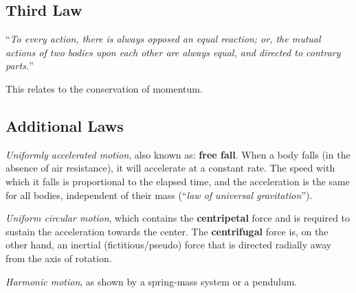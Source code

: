 \subsection{Third Law}\label{subsec:third-law}

``\textit{To every action, there is always opposed an equal reaction; or, the mutual actions of two bodies upon each other are always equal, and directed to contrary parts.}''

This relates to the conservation of momentum.

\subsection{Additional Laws}\label{subsec:additional-laws}

\noindent \textit{Uniformly accelerated motion}, also known as: \textbf{free fall}.
When a body falls (in the absence of air resistance), it will accelerate at a constant rate.
The speed with which it falls is proportional to the elapsed time, and the acceleration is the same for all bodies, independent of their mass (``\textit{law of universal gravitation}'').

\vspace{5pt}
\noindent \textit{Uniform circular motion}, which contains the \textbf{centripetal} force and is required to sustain the acceleration towards the center.
The \textbf{centrifugal} force is, on the other hand, an inertial (fictitious/pseudo) force that is directed radially away from the axis of rotation.

\vspace{5pt}
\noindent \textit{Harmonic motion}, as shown by a spring-mass system or a pendulum.
